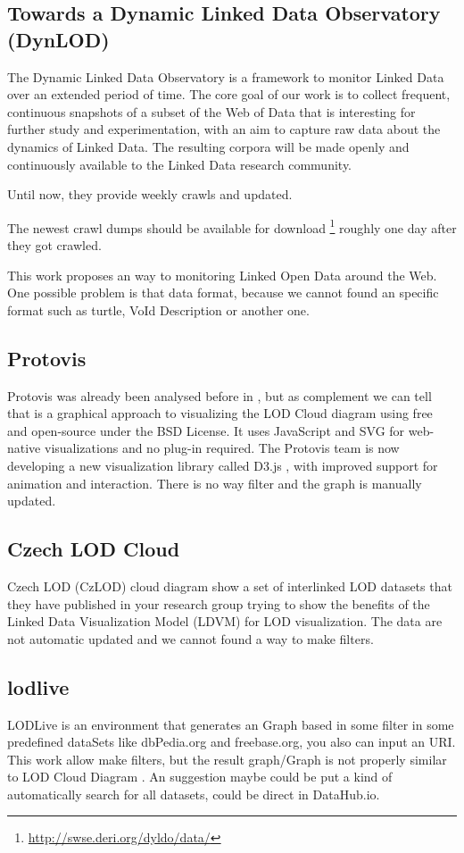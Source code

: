 \documentclass{iosart2c}
\begin{document}
\subsection{Towards a Dynamic Linked Data Observatory (DynLOD)}
The Dynamic Linked Data Observatory \cite{dynlod} is a framework to monitor Linked Data over an extended period of time. The core goal of our work is to collect frequent, continuous snapshots of a subset of the Web of Data that is interesting for further study and experimentation, with an aim to capture raw data about the dynamics of Linked Data. The resulting corpora will be made openly and continuously available to the Linked Data research community.

Until now, they provide weekly crawls and updated.

The newest crawl dumps should be available for download \footnote{\url{http://swse.deri.org/dyldo/data/}} roughly one day after they got crawled.

This work \cite{dynlod} proposes an way to monitoring Linked Open Data around the Web.
One possible problem is that data format, because we cannot found an specific format such as turtle, VoId Description or another one.

\subsection{Protovis} 
Protovis \cite{Protovis} was already been analysed before in \cite{SurveyLODDiagram1}, but as complement we can tell that is a graphical approach to visualizing the LOD Cloud diagram using free and open-source under the BSD License. It uses JavaScript and SVG for web-native visualizations and no plug-in required.
The Protovis team is now developing a new visualization library called D3.js \cite{d3js}, with improved support for animation and interaction.
There is no way filter and the graph is manually updated.

\subsection{Czech LOD Cloud}
Czech LOD (CzLOD) cloud diagram \cite{app24} show a set of interlinked LOD datasets that they have published in your research group trying to show the benefits of the Linked Data Visualization Model (LDVM) for LOD visualization.
The data are not automatic updated and we cannot found a way to make filters.

\subsection{lodlive} 
LODLive \cite{lodlive1} is an environment that generates an Graph based in some filter in some predefined dataSets like dbPedia.org and freebase.org, you also can input an URI.
This work allow make filters, but the result graph/Graph is not properly similar to LOD Cloud Diagram \cite{lodcloud}.
An suggestion maybe could be put a kind of automatically search for all datasets, could be direct in DataHub.io.
\end{document}
